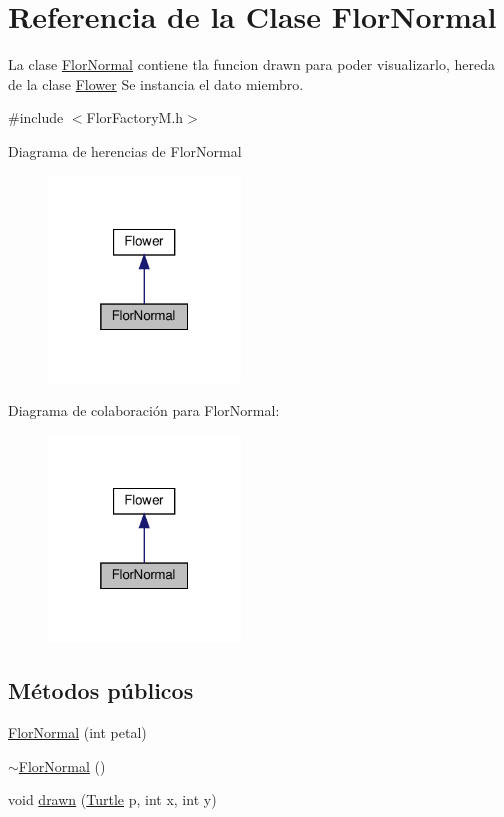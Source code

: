 \hypertarget{classFlorNormal}{}\section{Referencia de la Clase Flor\+Normal}
\label{classFlorNormal}


La clase \hyperlink{classFlorNormal}{Flor\+Normal} contiene tla funcion drawn para poder visualizarlo, hereda de la clase \hyperlink{classFlower}{Flower}  Se instancia el dato miembro.  




{\ttfamily \#include $<$Flor\+Factory\+M.\+h$>$}



Diagrama de herencias de Flor\+Normal\nopagebreak
\begin{figure}[H]
\begin{center}
\leavevmode
\includegraphics[width=145pt]{classFlorNormal__inherit__graph}
\end{center}
\end{figure}


Diagrama de colaboración para Flor\+Normal\+:\nopagebreak
\begin{figure}[H]
\begin{center}
\leavevmode
\includegraphics[width=145pt]{classFlorNormal__coll__graph}
\end{center}
\end{figure}
\subsection*{Métodos públicos}
\begin{DoxyCompactItemize}
\item 
\hyperlink{classFlorNormal_a625a13a2e2d334eceb295ef994637d25}{Flor\+Normal} (int petal)
\item 
\hyperlink{classFlorNormal_a96ed2aba6c2f54bd4312330ad1d56d42}{$\sim$\+Flor\+Normal} ()
\item 
void \hyperlink{classFlorNormal_a2e8ae341ef8bea1459baa12966eb1cd2}{drawn} (\hyperlink{classTurtle}{Turtle} p, int x, int y)
\end{DoxyCompactItemize}
